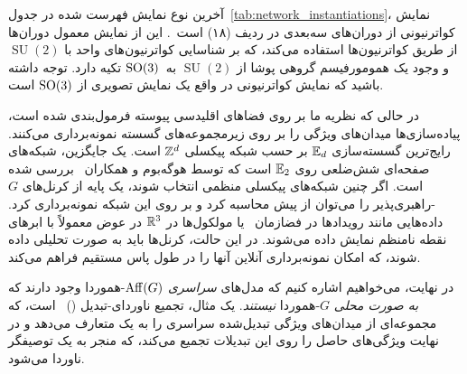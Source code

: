آخرین نوع نمایش فهرست شده در جدول~\ref{tab:network_instantiations}، نمایش کواترنیونی از دوران‌های سه‌بعدی در ردیف (۱۸) است~\cite{zhang2019quaternion}.
این از نمایش معمول دوران‌ها از طریق کواترنیون‌ها استفاده می‌کند، که بر شناسایی کواترنیون‌های واحد با $\operatorname{SU}(2)$ و وجود یک همومورفیسم گروهی پوشا از $\operatorname{SU}(2)$ به~$\operatorname{SO}(3)$ تکیه دارد.
توجه داشته باشید که نمایش کواترنیونی در واقع یک نمایش تصویری از $\operatorname{SO}(3)$ است.


در حالی که نظریه ما بر روی فضاهای اقلیدسی پیوسته فرمول‌بندی شده است، پیاده‌سازی‌ها میدان‌های ویژگی را بر روی زیرمجموعه‌های گسسته نمونه‌برداری می‌کنند.
رایج‌ترین گسسته‌سازی $\mathbb{E}_d$ بر حسب شبکه پیکسلی $\mathbb{Z}^d$ است.
یک جایگزین، شبکه‌های صفحه‌ای شش‌ضلعی روی $\mathbb{E}_2$ است که توسط  هوگه‌بوم و همکاران~\cite{Hoogeboom2018-HEX} بررسی شده است.
اگر چنین شبکه‌های پیکسلی منظمی انتخاب شوند، یک پایه از کرنل‌های $G$-راهبری‌پذیر را می‌توان از پیش محاسبه کرد و بر روی این شبکه نمونه‌برداری کرد.
داده‌هایی مانند رویدادها در فضازمان~\cite{shutty2020learning} یا مولکول‌ها در $\mathbb{R}^3$ \cite{Thomas2018-TFN,Kondor2018-NBN,anderson2019cormorant,miller2020relevance} در عوض معمولاً با ابرهای نقطه نامنظم نمایش داده می‌شوند.
در این حالت، کرنل‌ها باید به صورت تحلیلی داده شوند، که امکان نمونه‌برداری آنلاین آنها را در طول پاس مستقیم فراهم می‌کند.


در نهایت، می‌خواهیم اشاره کنیم که مدل‌های \emph{سراسری} $\operatorname{Aff}(G)$-هموردا وجود دارند که \emph{به صورت محلی} $G$-هموردا \emph{نیستند}.
یک مثال، تجمیع ناوردای-تبدیل 
()~\cite{Laptev_2016_CVPR} است، که مجموعه‌ای از میدان‌های ویژگی تبدیل‌شده سراسری را به یک  متعارف می‌دهد و در نهایت ویژگی‌های حاصل را روی این تبدیلات تجمیع می‌کند، که منجر به یک توصیفگر ناوردا می‌شود.